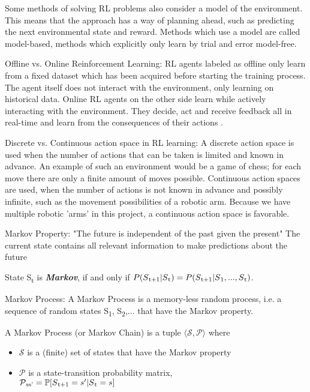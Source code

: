 Some methods of solving RL problems also consider a model of the environment. This means that the approach has a way of planning ahead, such as predicting the next environmental state and reward.
Methods which use a model are called model-based, methods which explicitly only learn by trial and error model-free\parencite{sutton2018reinforcement}.

Offline vs. Online Reinforcement Learning: 
RL agents labeled as offline only learn from a fixed dataset which has been acquired before starting the training process.
The agent itself does not interact with the environment, only learning on historical data.
Online RL agents on the other side learn while actively interacting with the environment.
They decide, act and receive feedback all in real-time and learn from the consequences of their actions \parencite{schrittwieser2021online}.



Discrete vs. Continuous action space in RL learning: 
A discrete action space is used when the number of actions that can be taken is limited and known in advance. An example of such an environment would be a game of chess; for each move there are only a finite amount of moves possible.
Continuous action spaces are used, when the number of actions is not known in advance and possibly infinite, such as the movement possibilities of a robotic arm.
Because we have multiple robotic 'arms' in this project, a continuous action space is favorable.


Markov Property: "The future is independent of the past given the present"
The current state contains all relevant information to make predictions about the future
\begin{definition*}
	State S\textsubscript{t} is \textbf{\textit{Markov}}, if and only if
	$ P(S\textsubscript{t+1} | S\textsubscript{t}) = P(S\textsubscript{t+1} | S\textsubscript{1},...,S\textsubscript{t}) $.
\end{definition*}

Markov Process:
A Markov Process is a memory-less random process, i.e. a sequence of random states S\textsubscript{1}, S\textsubscript{2},... that have the Markov property.

\begin{definition*}
	A Markov Process (or Markov Chain) is a tuple $\langle\mathcal{S,P}\rangle$ where
		\begin{itemize}
		\item $\mathcal{S}$ is a (finite) set of states that have the Markov property
		\item $\mathcal{P}$ is a state-transition probability matrix,\\
		$\mathcal{P}\textsubscript{ss'} = \mathbb{P}[S\textsubscript{t+1} = s'|S\textsubscript{t}=s] $
	\end{itemize}
\end{definition*}

